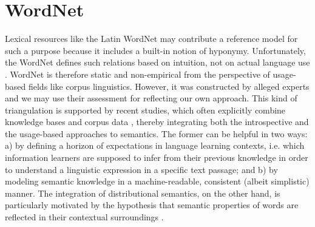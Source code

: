 \section{WordNet}
\label{WordNet}
Lexical resources like the Latin WordNet \parencite{minozziLatinWordNetProject2010} may contribute a reference model for such a purpose because it includes a built-in notion of hyponymy. Unfortunately, the WordNet defines such relations based on intuition, not on actual language use \parencite[315]{fellbaumChallengesMultilingualWordnet2012}. WordNet is therefore static and non-empirical from the perspective of usage-based fields like corpus linguistics. However, it was constructed by alleged experts and we may use their assessment for reflecting our own approach. This kind of triangulation is supported by recent studies, which often explicitly combine knowledge bases and corpus data \parencite[984-988]{onoWordEmbeddingbasedAntonym2015}, thereby integrating both the introspective and the usage-based approaches to semantics. The former can be helpful in two ways: a) by defining a horizon of expectations in language learning contexts, i.e. which information learners are supposed to infer from their previous knowledge in order to understand a linguistic expression in a specific text passage; and b) by modeling semantic knowledge in a machine-readable, consistent (albeit simplistic) manner. The integration of distributional semantics, on the other hand, is particularly motivated by the hypothesis that semantic properties of words are reflected in their contextual surroundings \parencite[59]{griesBehavioralProfilesCorpusbased2009}. 

